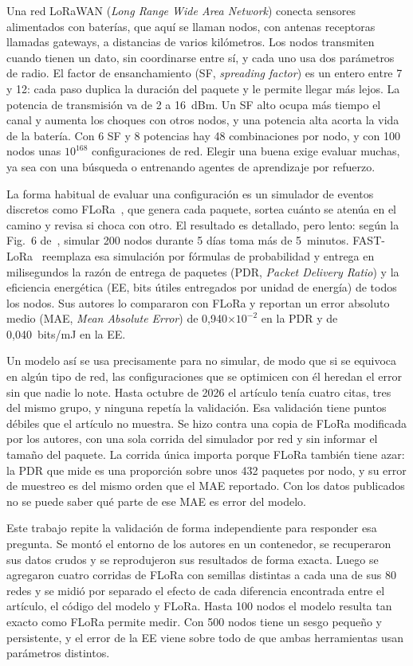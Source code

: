 \documentclass[conference,a4paper]{IEEEtran}
\begin{document}
Una red LoRaWAN (\emph{Long Range Wide Area Network}) conecta sensores alimentados con baterías, que aquí se llaman nodos, con antenas receptoras llamadas gateways, a distancias de varios kilómetros. Los nodos transmiten cuando tienen un dato, sin coordinarse entre sí, y cada uno usa dos parámetros de radio. El factor de ensanchamiento (SF, \emph{spreading factor}) es un entero entre 7 y 12: cada paso duplica la duración del paquete y le permite llegar más lejos. La potencia de transmisión va de 2 a 16~dBm. Un SF alto ocupa más tiempo el canal y aumenta los choques con otros nodos, y una potencia alta acorta la vida de la batería. Con 6 SF y 8 potencias hay 48 combinaciones por nodo, y con 100 nodos unas $10^{168}$ configuraciones de red. Elegir una buena exige evaluar muchas, ya sea con una búsqueda o entrenando agentes de aprendizaje por refuerzo.

La forma habitual de evaluar una configuración es un simulador de eventos discretos como FLoRa~\cite{flora}, que genera cada paquete, sortea cuánto se atenúa en el camino y revisa si choca con otro. El resultado es detallado, pero lento: según la Fig.~6 de~\cite{fastlora}, simular 200 nodos durante 5 días toma más de 5~minutos. FAST-LoRa~\cite{fastlora} reemplaza esa simulación por fórmulas de probabilidad y entrega en milisegundos la razón de entrega de paquetes (PDR, \emph{Packet Delivery Ratio}) y la eficiencia energética (EE, bits útiles entregados por unidad de energía) de todos los nodos. Sus autores lo compararon con FLoRa y reportan un error absoluto medio (MAE, \emph{Mean Absolute Error}) de 0,940$\times10^{-2}$ en la PDR y de 0,040~bits/mJ en la EE.

Un modelo así se usa precisamente para no simular, de modo que si se equivoca en algún tipo de red, las configuraciones que se optimicen con él heredan el error sin que nadie lo note. Hasta octubre de 2026 el artículo tenía cuatro citas, tres del mismo grupo, y ninguna repetía la validación. Esa validación tiene puntos débiles que el artículo no muestra. Se hizo contra una copia de FLoRa modificada por los autores, con una sola corrida del simulador por red y sin informar el tamaño del paquete. La corrida única importa porque FLoRa también tiene azar: la PDR que mide es una proporción sobre unos 432 paquetes por nodo, y su error de muestreo es del mismo orden que el MAE reportado. Con los datos publicados no se puede saber qué parte de ese MAE es error del modelo.

Este trabajo repite la validación de forma independiente para responder esa pregunta. Se montó el entorno de los autores en un contenedor, se recuperaron sus datos crudos y se reprodujeron sus resultados de forma exacta. Luego se agregaron cuatro corridas de FLoRa con semillas distintas a cada una de sus 80 redes y se midió por separado el efecto de cada diferencia encontrada entre el artículo, el código del modelo y FLoRa. Hasta 100 nodos el modelo resulta tan exacto como FLoRa permite medir. Con 500 nodos tiene un sesgo pequeño y persistente, y el error de la EE viene sobre todo de que ambas herramientas usan parámetros distintos.
\end{document}
